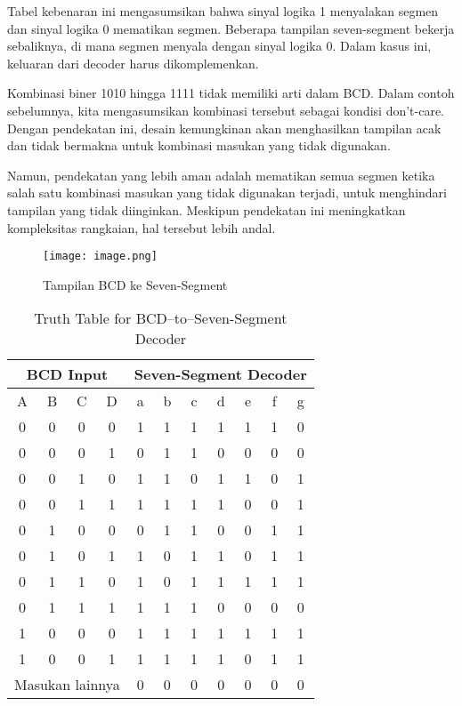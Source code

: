 \documentclass{article}
\begin{document}
Tabel kebenaran ini mengasumsikan bahwa sinyal logika 1 menyalakan segmen dan sinyal logika 0 mematikan segmen. Beberapa tampilan seven-segment bekerja sebaliknya, di mana segmen menyala dengan sinyal logika 0. Dalam kasus ini, keluaran dari decoder harus dikomplemenkan.

Kombinasi biner 1010 hingga 1111 tidak memiliki arti dalam BCD. Dalam contoh sebelumnya, kita mengasumsikan kombinasi tersebut sebagai kondisi don't-care. Dengan pendekatan ini, desain kemungkinan akan menghasilkan tampilan acak dan tidak bermakna untuk kombinasi masukan yang tidak digunakan. 

Namun, pendekatan yang lebih aman adalah mematikan semua segmen ketika salah satu kombinasi masukan yang tidak digunakan terjadi, untuk menghindari tampilan yang tidak diinginkan. Meskipun pendekatan ini meningkatkan kompleksitas rangkaian, hal tersebut lebih andal.

\begin{figure}[h!]
    \centering
    \texttt{[image: image.png]}
    \caption{Tampilan BCD ke Seven-Segment}
    \label{fig:display-bcd-seven-segment}
\end{figure}

\begin{table}[h!]
\centering
\begin{tabular}{|c|c|c|c|c|c|c|c|c|c|c|}
\hline
\multicolumn{4}{|c|}{\textbf{BCD Input}} & \multicolumn{7}{c|}{\textbf{Seven-Segment Decoder}} \\ 
\hline
A & B & C & D & a & b & c & d & e & f & g \\
\hline
0 & 0 & 0 & 0 & 1 & 1 & 1 & 1 & 1 & 1 & 0 \\
0 & 0 & 0 & 1 & 0 & 1 & 1 & 0 & 0 & 0 & 0 \\
0 & 0 & 1 & 0 & 1 & 1 & 0 & 1 & 1 & 0 & 1 \\
0 & 0 & 1 & 1 & 1 & 1 & 1 & 1 & 0 & 0 & 1 \\
0 & 1 & 0 & 0 & 0 & 1 & 1 & 0 & 0 & 1 & 1 \\
0 & 1 & 0 & 1 & 1 & 0 & 1 & 1 & 0 & 1 & 1 \\
0 & 1 & 1 & 0 & 1 & 0 & 1 & 1 & 1 & 1 & 1 \\
0 & 1 & 1 & 1 & 1 & 1 & 1 & 0 & 0 & 0 & 0 \\
1 & 0 & 0 & 0 & 1 & 1 & 1 & 1 & 1 & 1 & 1 \\
1 & 0 & 0 & 1 & 1 & 1 & 1 & 1 & 0 & 1 & 1 \\
\hline
\multicolumn{4}{|c|}{Masukan lainnya} & 0 & 0 & 0 & 0 & 0 & 0 & 0 \\
\hline
\end{tabular}
\caption{Truth Table for BCD–to–Seven-Segment Decoder}
\end{table}
\end{document}
